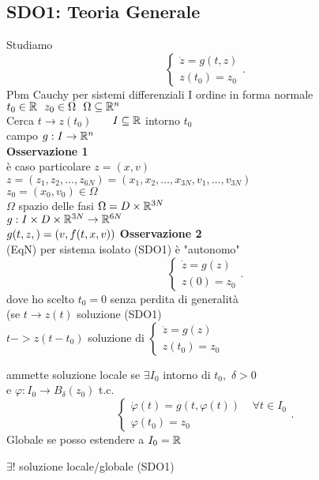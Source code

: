 \documentclass[12px]{article}
\begin{document}
\subsection{SDO1: Teoria Generale}
Studiamo 
\[
\begin{cases}
	\dot z = g(t,z)\\
	z(t_0) = z_0
\end{cases}
.\] 
Pbm Cauchy per sistemi differenziali I ordine in forma normale\\
$t_0\in\mathbb{R} \ \ z_0\in\Omega\ \ \Omega\subseteq \mathbb{R}^n$\\
Cerca $t \rightarrow z(t_0)$ \ \ \ $I\subseteq \mathbb{R}$ intorno  $t_0$\\
campo $g: I\time \Omega \rightarrow\R^n$\\
\textbf{Osservazione 1}\\
è caso particolare $z = (x,v)$\\
$z = (z_1,z_2,\ldots,z_{6N}) = (x_1,x_2,\ldots,x_{3N}, v_1,\ldots,v_{3N})$\\
$z_0 = (x_0,v_0)\in\Omega$\\
$\Omega$ spazio delle fasi $\Omega = D\times \mathbb{R}^{3N}$\\
$g: I\times D\times \mathbb{R}^{3N} \rightarrow \mathbb{R}^{6N}$\\
$g(t,z,) = (v,f(t,x,v))\\$
\textbf{Osservazione 2}\\
(EqN) per sistema isolato (SDO1) è "autonomo"\\
\[
\begin{cases}
	\dot z = g(z)\\
	z(0) = z_0
\end{cases}
.\] 
dove ho scelto $t_0 = 0$ senza perdita di generalità\\
(se $t \rightarrow z(t)$ soluzione (SDO1)\\
$t -> z(t-t_0)$ soluzione di $ \begin{cases}
	\dot z = g(z)\\
	z(t_0) = z_0
\end{cases}$\\
\begin{defi}[SDO1]
	ammette soluzione locale se $\exists I_0$ intorno di $t_0,$ $\delta > 0 $\\
	e  $ \varphi : I_0 \rightarrow B_\delta (z_0)$ t.c.\\
	\[
	\begin{cases}
		\dot \varphi(t) = g(t, \varphi(t)) \ \ \ \ \ \forall t\in I_0\\
		\varphi(t_0) = z_0
	\end{cases}
	.\] 
	Globale se posso estendere a $I_0 = \mathbb{R}$
\end{defi}
\begin{teo}
	$\exists !$ soluzione locale/globale (SDO1)
\end{teo}
\end{document}
